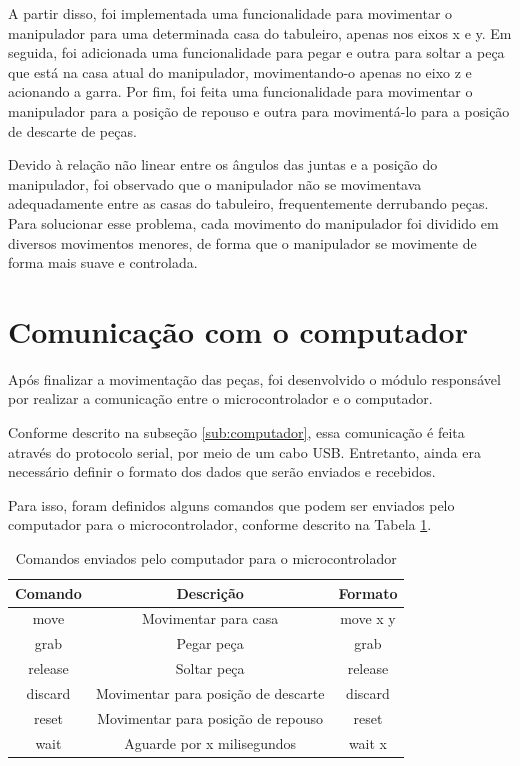 A partir disso, foi implementada uma funcionalidade para movimentar o manipulador para uma determinada casa do tabuleiro, apenas nos eixos x e y.
Em seguida, foi adicionada uma funcionalidade para pegar e outra para soltar a peça que está na casa atual do manipulador, movimentando-o apenas no eixo z e acionando a garra.
Por fim, foi feita uma funcionalidade para movimentar o manipulador para a posição de repouso e outra para movimentá-lo para a posição de descarte de peças.

Devido à relação não linear entre os ângulos das juntas e a posição do manipulador,
foi observado que o manipulador não se movimentava adequadamente entre as casas do tabuleiro,
frequentemente derrubando peças.
Para solucionar esse problema, cada movimento do manipulador foi dividido em diversos movimentos menores,
de forma que o manipulador se movimente de forma mais suave e controlada.

\section[Comunicação com o computador]{Comunicação com o computador}
\label{sec:comunicacaoComputador}

Após finalizar a movimentação das peças, foi desenvolvido o módulo responsável por realizar a comunicação entre o microcontrolador e o computador.

Conforme descrito na subseção \ref{sub:computador}, essa comunicação é feita através do protocolo serial, por meio de um cabo USB.
Entretanto, ainda era necessário definir o formato dos dados que serão enviados e recebidos.

Para isso, foram definidos alguns comandos que podem ser enviados pelo computador para o microcontrolador, conforme descrito na Tabela \ref{tab:comandosMicrocontrolador}.

\begin{table}[H]
    \centering
    \caption{Comandos enviados pelo computador para o microcontrolador}
    \begin{tabular}{|c|c|c|}
        \hline
        \textbf{Comando} & \textbf{Descrição} & \textbf{Formato} \\
        \hline
        move & Movimentar para casa & move x y \\
        \hline
        grab & Pegar peça & grab \\
        \hline
        release & Soltar peça & release \\
        \hline
        discard & Movimentar para posição de descarte & discard \\
        \hline
        reset & Movimentar para posição de repouso & reset \\
        \hline
        wait & Aguarde por x milisegundos & wait x \\
        \hline
    \end{tabular}
    \label{tab:comandosMicrocontrolador}
\end{table}

